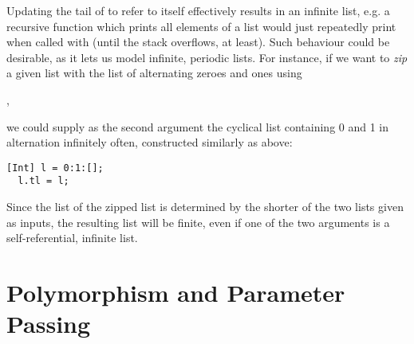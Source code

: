 Updating the tail of  to refer to  itself effectively results in
an infinite list, e.g. a recursive function which prints all elements of a list
would just repeatedly print  when called with  (until the stack
overflows, at least).
Such behaviour could be desirable, as it lets us model infinite, periodic lists.
For instance, if we want to \emph{zip} a given list with the list of alternating
zeroes and ones using
\begin{center}
  ,
\end{center}
we could supply as the second argument the cyclical list containing 0 and 1 in
alternation infinitely often, constructed similarly as above:
\begin{lstlisting}[language=spl]
  [Int] l = 0:1:[];
  l.tl = l;
\end{lstlisting}
%
Since the list of the zipped list is determined by the shorter of the two lists
given as inputs, the resulting list will be finite, even if one of the two
arguments is a self-referential, infinite list.




\section{Polymorphism and Parameter Passing} \label{sec:polymorphism-boxing}

